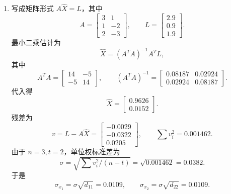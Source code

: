 \documentclass[UTF8,12pt,a4paper]{ctexart}
\begin{document}
\begin{enumerate}[label=\arabic*、]
\item 写成矩阵形式 $A\hat{X}=L$，其中
\begin{equation*}
A=\begin{bmatrix}3&1\\1&-2\\2&-3\end{bmatrix},\qquad
L=\begin{bmatrix}2.9\\0.9\\1.9\end{bmatrix}.
\end{equation*}
最小二乘估计为
\begin{equation*}
\hat{X}=(A^TA)^{-1}A^TL,
\end{equation*}
其中
\begin{equation*}
A^TA=\begin{bmatrix}14&-5\\-5&14\end{bmatrix},\qquad
(A^TA)^{-1}=\begin{bmatrix}0.08187&0.02924\\0.02924&0.08187\end{bmatrix}.
\end{equation*}
代入得
\begin{equation*}
    \hat{X}=\begin{bmatrix}0.9626\\0.0152\end{bmatrix}.
\end{equation*}
残差为
\begin{equation*}
    v=L-A\hat{X}=\begin{bmatrix}-0.0029\\-0.0322\\0.0205\end{bmatrix},\qquad
    \sum v_i^2=0.001462.
\end{equation*}
由于 $n=3,t=2$，单位权标准差为
\begin{equation*}
    \sigma=\sqrt{\sum v_i^2/(n-t)}=\sqrt{0.001462}=0.0382.
\end{equation*}
于是
\begin{equation*}
    \sigma_{x_1}=\sigma\sqrt{d_{11}}=0.0109,
    \qquad \sigma_{x_2}=\sigma\sqrt{d_{22}}=0.0109.
\end{equation*}

\newpage


\end{enumerate}
\end{document}
